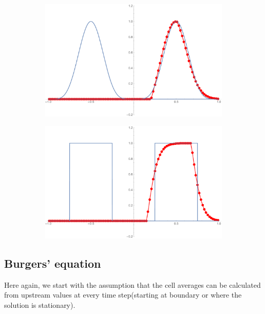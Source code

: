 \documentclass{article}
\begin{document}
\begin{figure}[h!]
	\begin{subfigure}{.5\textwidth}
	\centering
	\includegraphics[width=\textwidth]{smoothHump}
	\end{subfigure}
	\begin{subfigure}{.5\textwidth}
		\centering
		\includegraphics[width=\textwidth]{constant_discontinous}
	\end{subfigure}
\end{figure}

\subsection{Burgers' equation}

Here again, we start with the assumption that the cell averages can be calculated from upstream values at every time step(starting at boundary or where the solution is stationary).
\end{document}
